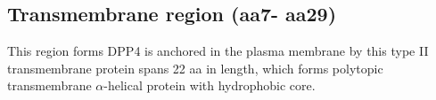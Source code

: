 \subsection{Transmembrane region (aa7- aa29)}

This region forms 
DPP4 is anchored in the plasma membrane by this type II transmembrane protein spans 22 aa in length, which forms polytopic transmembrane $\alpha$-helical protein with hydrophobic core.~\cite{Hong_1990} 
